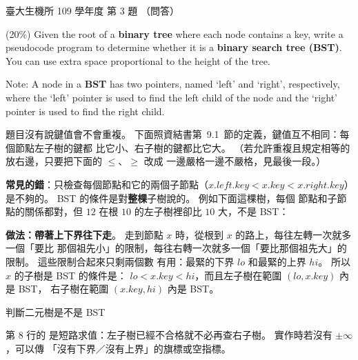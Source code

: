 \begin{pastexam}[label={px:ntu-109-bime-ds-03}]{臺大生機所 109 學年度 第 3 題}
（問答）

(20\%) Given the root of a \textbf{binary tree} where each node contains a key, write a pseudocode
program to determine whether it is a \textbf{binary search tree (BST)}. You can use extra space
proportional to the height of the tree.

Note: A node in a \textbf{BST} has two pointers, named `left' and `right', respectively, where the
`left' pointer is used to find the left child of the node and the `right' pointer is used to find
the right child.
\end{pastexam}

\begin{pastsoln}
題目沒有說鍵值會不會重複。 下面照資結書第~9.1~節的定義，鍵值互不相同：每個節點左子樹的鍵都
比它小、右子樹的鍵都比它大。 （若允許重複且規定相等的放右邊，只要把下面的 $\le$、$\ge$ 改成
一邊嚴格一邊不嚴格，見最後一段。）

\textbf{常見的錯}：只檢查每個節點和它的兩個子節點（$x.\mathit{left}.\mathit{key} < x.\mathit{key} <
x.\mathit{right}.\mathit{key}$）是不夠的。 BST 的條件是對\textbf{整棵}子樹說的。 例如下面這棵樹，每個
節點和子節點的關係都對，但 $12$ 在根 $10$ 的左子樹裡卻比 $10$ 大，不是 BST：
\begin{center}
\end{center}

\textbf{做法：帶著上下界往下走}。 走到節點 $x$ 時，從根到 $x$ 的路上，每往左轉一次就多一個「要比
那個祖先小」的限制，每往右轉一次就多一個「要比那個祖先大」的限制。 這些限制合起來只剩兩個數
有用：最緊的下界 $\mathit{lo}$ 和最緊的上界 $\mathit{hi}$。 所以 $x$ 的子樹是 BST 的條件是：
$\mathit{lo} < x.\mathit{key} < \mathit{hi}$，而且左子樹在範圍 $(\mathit{lo}, x.\mathit{key})$ 內是 BST，
右子樹在範圍 $(x.\mathit{key}, \mathit{hi})$ 內是 BST。

\begin{pseudo}{判斷二元樹是不是 BST}
    \State \Return {}
\EndFunction
\Statex
{} 
        \State \Return \TRUE {}
    \EndIf
        \State \Return \FALSE
    \EndIf
    \State \Return {} \AND {}
\EndFunction
\end{pseudo}
第 8 行的 \AND 是短路求值：左子樹已經不合格就不必再查右子樹。 實作時若沒有 $\pm\infty$，可以傳
「沒有下界／沒有上界」的旗標或空指標。


\end{pastsoln}
